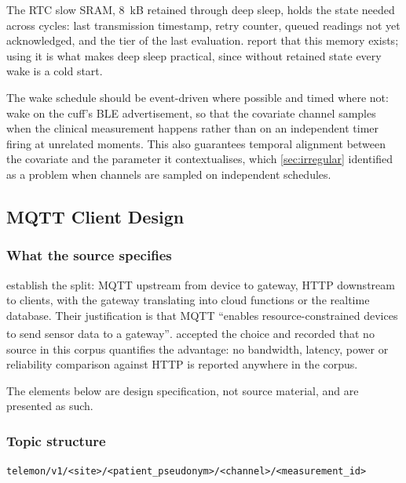 \documentclass[12pt,a4paper,oneside]{report}
\newcommand{\bq}[1]{``#1''\textsuperscript{\dag}}
\begin{document}
The RTC slow SRAM, 8~kB retained through deep sleep, holds the state needed across cycles: last transmission timestamp, retry counter, queued readings not yet acknowledged, and the tier of the last evaluation. \Textcite{efendi2025} report that this memory exists; using it is what makes deep sleep practical, since without retained state every wake is a cold start.

The wake schedule should be event-driven where possible and timed where not: wake on the cuff's BLE advertisement, so that the covariate channel samples when the clinical measurement happens rather than on an independent timer firing at unrelated moments. This also guarantees temporal alignment between the covariate and the parameter it contextualises, which \cref{sec:irregular} identified as a problem when channels are sampled on independent schedules.

\subsection{MQTT Client Design}\label{sec:mqtt-design}

\subsubsection{What the source specifies}

\Textcite{efendi2025} establish the split: MQTT upstream from device to gateway, HTTP downstream to clients, with the gateway translating into cloud functions or the realtime database. Their justification is that MQTT \bq{enables resource-constrained devices to send sensor data to a gateway}.  accepted the choice and recorded that no source in this corpus quantifies the advantage: no bandwidth, latency, power or reliability comparison against HTTP is reported anywhere in the corpus.

The elements below are design specification, not source material, and are presented as such.

\subsubsection{Topic structure}

\begin{center}
\texttt{telemon/v1/<site>/<patient\_pseudonym>/<channel>/<measurement\_id>}
\end{center}
\end{document}

